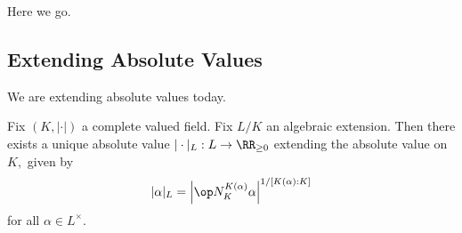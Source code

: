 














Here we go.

\subsection{Extending Absolute Values}
We are extending absolute values today.
\begin{theorem}
	Fix $(K,|\cdot|)$ a complete valued field. Fix $L/K$ an algebraic extension. Then there exists a unique absolute value $|\cdot|_L:L\to\RR_{\ge0}$ extending the absolute value on $K,$ given by
	\[|\alpha|_L=\left|\op N_K^{K(\alpha)}\alpha\right|^{1/[K(\alpha):K]}\]
	for all $\alpha\in L^\times.$
\end{theorem}
